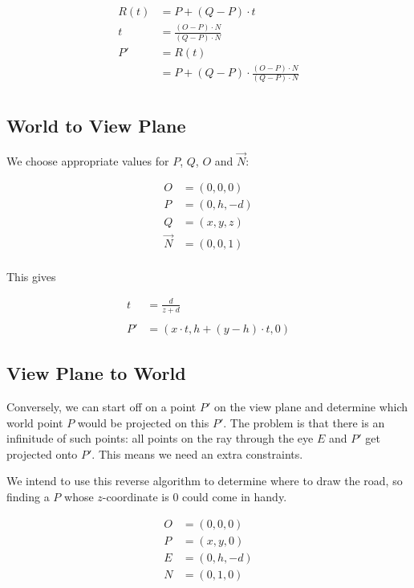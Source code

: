\documentclass[a4paper]{article}
\newcommand{\coords}[3]{\ensuremath{(#1,#2,#3)}}
\begin{document}
\begin{align*}
    R(t) & = P + (Q - P) \cdot t \\
    t & = \frac{(O-P) \cdot N}{(Q-P) \cdot N} \\
    P' & = R(t) \\
       & = P + (Q - P) \cdot \frac{(O-P) \cdot N}{(Q-P) \cdot N} \\
\end{align*}

\subsection{World to View Plane}\label{sec:world2view}

We choose appropriate values for $P$, $Q$, $O$ and $\vec{N}$:

\begin{align*}
    O & = \coords{0}{0}{0} \\
    P & = \coords{0}{h}{-d} \\
    Q & = \coords{x}{y}{z} \\
    \vec{N} & = \coords{0}{0}{1} \\
\end{align*}

This gives

\begin{align*}
    t & = \frac{d}{z + d} \\ \\
    P' & = \coords{x \cdot t}{h + (y - h) \cdot t}{0}
\end{align*}

\subsection{View Plane to World} \label{sec:view2world}

Conversely, we can start off on a point $P'$ on the view plane and determine which world point $P$ would be projected on this $P'$.
The problem is that there is an infinitude of such points: all points on the ray through the eye $E$ and $P'$ get projected onto $P'$.
This means we need an extra constraints.

We intend to use this reverse algorithm to determine where to draw the road, so finding a $P$ whose $z$-coordinate is $0$ could come in handy.

\begin{align*}
    O & = \coords{0}{0}{0} \\
    P & = \coords{x}{y}{0} \\
    E & = \coords{0}{h}{-d} \\
    N & = \coords{0}{1}{0} \\
\end{align*}
\end{document}
